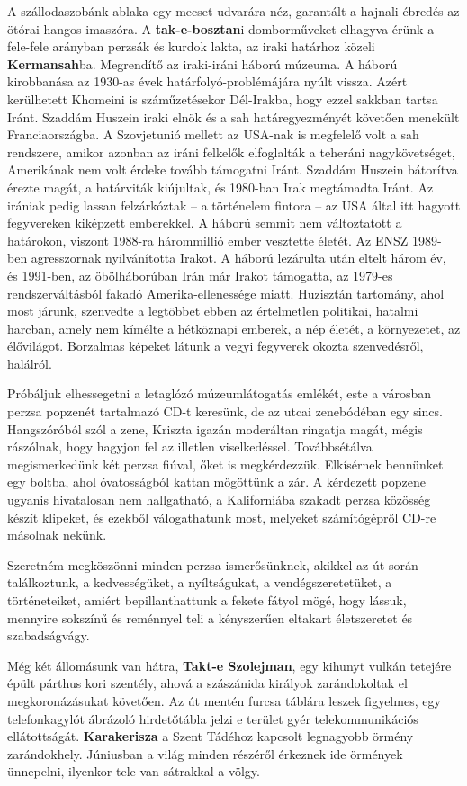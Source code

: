 A szállodaszobánk ablaka egy mecset udvarára néz, garantált a hajnali
ébredés az ötórai hangos imaszóra. A \textbf{tak-e-bosztan}i domborműveket
elhagyva érünk a fele-fele arányban perzsák és kurdok lakta, az iraki
határhoz közeli \textbf{Kermansah}ba. Megrendítő az iraki-iráni háború
múzeuma. A háború kirobbanása az 1930-as évek határfolyó-problémájára
nyúlt vissza. Azért kerülhetett Khomeini is száműzetésekor Dél-Irakba,
hogy ezzel sakkban tartsa Iránt. Szaddám Huszein iraki elnök és a sah
határegyezményét követően menekült Franciaországba. A Szovjetunió
mellett az USA-nak is megfelelő volt a sah rendszere, amikor azonban
az iráni felkelők elfoglalták a teheráni nagykövetséget, Amerikának nem
volt érdeke tovább támogatni Iránt. Szaddám Huszein bátorítva érezte
magát, a határviták kiújultak, és 1980-ban Irak megtámadta Iránt. Az
irániak pedig lassan felzárkóztak -- a történelem fintora -- az USA által
itt hagyott fegyvereken kiképzett emberekkel. A háború semmit nem
változtatott a határokon, viszont 1988-ra hárommillió ember vesztette
életét. Az ENSZ 1989-ben agresszornak nyilvánította Irakot. A háború
lezárulta után eltelt három év, és 1991-ben, az öbölháborúban Irán már
Irakot támogatta, az 1979-es rendszerváltásból fakadó Amerika-ellenessége
miatt. Huzisztán tartomány, ahol most járunk, szenvedte a legtöbbet
ebben az értelmetlen politikai, hatalmi harcban, amely nem kímélte a
hétköznapi emberek, a nép életét, a környezetet, az élővilágot. Borzalmas
képeket látunk a vegyi fegyverek okozta szenvedésről, halálról.

Próbáljuk elhessegetni a letaglózó múzeumlátogatás emlékét, este a
városban perzsa popzenét tartalmazó CD-t keresünk, de az utcai zenebódéban
egy sincs. Hangszóróból szól a zene, Kriszta igazán moderáltan
ringatja magát, mégis rászólnak, hogy hagyjon fel az illetlen viselkedéssel.
Továbbsétálva megismerkedünk két perzsa fiúval, őket is megkérdezzük.
Elkísérnek bennünket egy boltba, ahol óvatosságból kattan mögöttünk
a zár. A kérdezett popzene ugyanis hivatalosan nem hallgatható, a Kaliforniába
szakadt perzsa közösség készít klipeket, és ezekből válogathatunk
most, melyeket számítógépről CD-re másolnak nekünk.

Szeretném megköszönni minden perzsa ismerősünknek, akikkel
az út során találkoztunk, a kedvességüket, a nyíltságukat, a vendégszeretetüket,
a történeteiket, amiért bepillanthattunk a fekete fátyol
mögé, hogy lássuk, mennyire sokszínű és reménnyel teli a kényszerűen
eltakart életszeretet és szabadságvágy.

Még két állomásunk van hátra, \textbf{Takt-e Szolejman}, egy kihunyt
vulkán tetejére épült párthus kori szentély, ahová a szászánida királyok
zarándokoltak el megkoronázásukat követően. Az út mentén furcsa
táblára leszek figyelmes, egy telefonkagylót ábrázoló hirdetőtábla jelzi
e terület gyér telekommunikációs ellátottságát. \textbf{Karakerisza} a Szent
Tádéhoz kapcsolt legnagyobb örmény zarándokhely. Júniusban a világ
minden részéről érkeznek ide örmények ünnepelni, ilyenkor tele van
sátrakkal a völgy.

